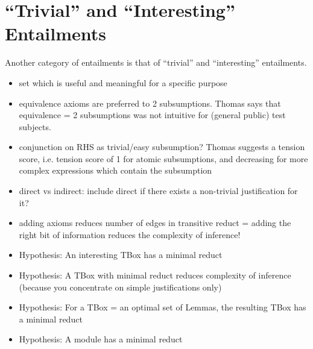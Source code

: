 \section*{\enquote{Trivial} and \enquote{Interesting} Entailments}

Another category of entailments is that of \enquote{trivial} and \enquote{interesting} entailments.


\begin{itemize}
\item set which is useful and meaningful for a specific purpose
\item equivalence axioms are preferred to 2 subsumptions. Thomas says that equivalence = 2 subsumptions was not intuitive for (general public) test subjects.
\item conjunction on RHS as trivial/easy subsumption? Thomas suggests a tension score, i.e. tension score of 1 for atomic subsumptions, and decreasing for more complex expressions which contain the subsumption
\item direct vs indirect: include direct if there exists a non-trivial justification for it?
\item adding axioms reduces number of edges in transitive reduct = adding the right bit of information reduces the complexity of inference!
\item Hypothesis: An interesting TBox has a minimal reduct
\item Hypothesis: A TBox with minimal reduct reduces complexity of inference (because you concentrate on simple justifications only)
\item Hypothesis: For a TBox = an optimal set of Lemmas, the resulting TBox has a minimal reduct
\item Hypothesis: A module has a minimal reduct
\end{itemize}



